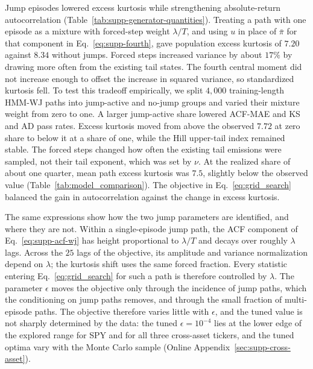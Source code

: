 Jump episodes lowered excess kurtosis while strengthening
absolute-return autocorrelation
(Table~\ref{tab:supp-generator-quantities}). Treating a path with one
episode as a mixture with forced-step weight $\lambda/T$, and using
$u$ in place of $\bar\pi$ for that component in
Eq.~\eqref{eq:supp-fourth}, gave population excess kurtosis of $7.20$
against $8.34$ without jumps. Forced steps increased variance by
about $17\%$ by drawing more often from the existing tail states.
The fourth central moment did not increase enough to offset the
increase in squared variance, so standardized kurtosis fell. To test
this tradeoff empirically, we split $4{,}000$ training-length HMM-WJ
paths into jump-active and no-jump groups and varied their mixture
weight from zero to one. A larger jump-active share lowered ACF-MAE
and KS and AD pass rates. Excess kurtosis moved from above the
observed $7.72$ at zero share to below it at a share of one, while
the Hill upper-tail index remained stable. The forced steps changed
how often the existing tail emissions were sampled, not their tail
exponent, which was set by $\nu$. At the realized share of about one
quarter, mean path excess kurtosis was $7.5$, slightly below the
observed value (Table~\ref{tab:model_comparison}). The objective in
Eq.~\eqref{eq:grid_search} balanced the gain in autocorrelation
against the change in excess kurtosis.

The same expressions show how the two jump parameters are identified,
and where they are not. Within a single-episode jump path, the ACF
component of Eq.~\eqref{eq:supp-acf-wj} has height proportional to
$\lambda / T$ and decays over roughly $\lambda$ lags. Across the
$25$ lags of the objective, its amplitude and variance normalization
depend on $\lambda$; the kurtosis shift uses the same forced fraction.
Every statistic entering Eq.~\eqref{eq:grid_search} for such a path
is therefore controlled by $\lambda$. The parameter $\epsilon$ moves
the objective only through the incidence of jump paths, which the
conditioning on jump paths removes, and through the small fraction of
multi-episode paths. The objective therefore varies little with
$\epsilon$, and the tuned value is not sharply determined by the
data: the tuned $\epsilon = 10^{-4}$ lies at the lower edge of the
explored range for SPY and for all three cross-asset tickers, and the
tuned optima vary with the Monte Carlo sample (Online
Appendix~\ref{sec:supp-cross-asset}).


